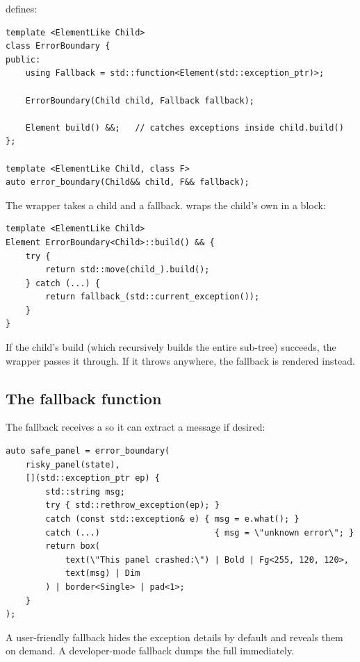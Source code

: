  defines:

\begin{lstlisting}
template <ElementLike Child>
class ErrorBoundary {
public:
    using Fallback = std::function<Element(std::exception_ptr)>;

    ErrorBoundary(Child child, Fallback fallback);

    Element build() &&;   // catches exceptions inside child.build()
};

template <ElementLike Child, class F>
auto error_boundary(Child&& child, F&& fallback);
\end{lstlisting}

The wrapper takes a child and a fallback.  wraps the
child's own  in a  block:

\begin{lstlisting}
template <ElementLike Child>
Element ErrorBoundary<Child>::build() && {
    try {
        return std::move(child_).build();
    } catch (...) {
        return fallback_(std::current_exception());
    }
}
\end{lstlisting}

If the child's build (which recursively builds the entire
sub-tree) succeeds, the wrapper passes it through. If it throws
anywhere, the fallback is rendered instead.

\subsection*{The fallback function}

The fallback receives a  so it can
extract a message if desired:

\begin{lstlisting}
auto safe_panel = error_boundary(
    risky_panel(state),
    [](std::exception_ptr ep) {
        std::string msg;
        try { std::rethrow_exception(ep); }
        catch (const std::exception& e) { msg = e.what(); }
        catch (...)                       { msg = \"unknown error\"; }
        return box(
            text(\"This panel crashed:\") | Bold | Fg<255, 120, 120>,
            text(msg) | Dim
        ) | border<Single> | pad<1>;
    }
);
\end{lstlisting}

A user-friendly fallback hides the exception details by default
and reveals them on demand. A developer-mode fallback dumps the
full  immediately.

